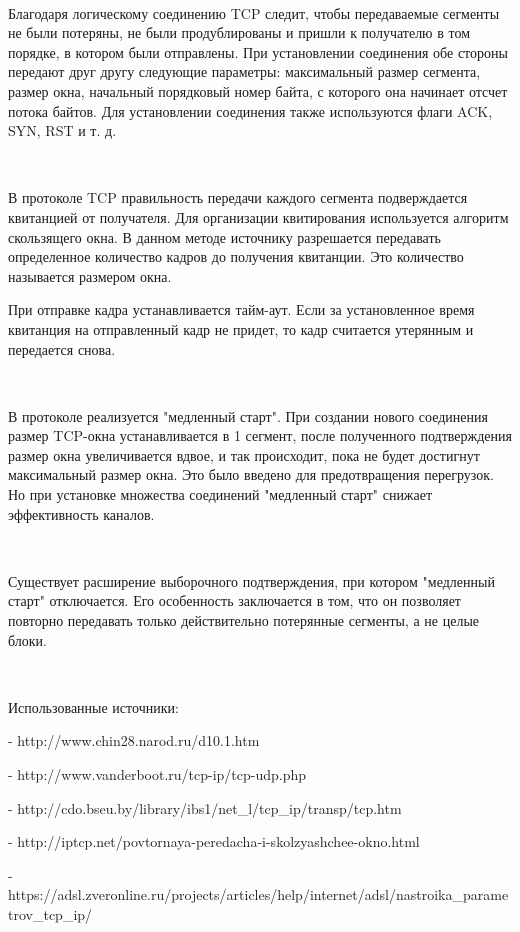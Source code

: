 \documentclass{article}
\begin{document}
~\

Благодаря логическому соединению TCP следит, чтобы передаваемые сегменты не были потеряны, не были продублированы и пришли к получателю в том порядке, в котором были отправлены.
При установлении соединения обе стороны передают друг другу следующие параметры: максимальный размер сегмента, размер окна, начальный порядковый номер байта, с которого она начинает отсчет потока байтов. Для установлении соединения также используются флаги ACK, SYN, RST и т. д.

~\

В протоколе TCP правильность передачи каждого сегмента подверждается квитанцией от получателя. Для организации квитирования используется алгоритм скользящего окна. В данном методе источнику разрешается передавать определенное количество кадров до получения квитанции. Это количество называется размером окна. 

При отправке кадра устанавливается тайм-аут. Если за установленное время квитанция на отправленный кадр не придет, то кадр считается утерянным и передается снова. 

~\

В протоколе реализуется "медленный старт". При создании нового соединения размер TCP-окна устанавливается в 1 сегмент, после полученного подтверждения размер окна увеличивается вдвое, и так происходит, пока не будет достигнут максимальный размер окна. Это было введено для предотвращения перегрузок. Но при установке множества соединений "медленный старт" снижает эффективность каналов.

~\

Существует расширение выборочного подтверждения, при котором "медленный старт" отключается. Его особенность заключается в том, что он позволяет повторно передавать только действительно потерянные сегменты, а не целые блоки.

~\

Использованные источники:

- http://www.chin28.narod.ru/d10.1.htm 

- http://www.vanderboot.ru/tcp-ip/tcp-udp.php

- http://cdo.bseu.by/library/ibs1/net\_l/tcp\_ip/transp/tcp.htm

- http://iptcp.net/povtornaya-peredacha-i-skolzyashchee-okno.html

-https://adsl.zveronline.ru/projects/articles/help/internet/adsl/nastroika\_parametrov\_tcp\_ip/

\newpage
\end{document}
